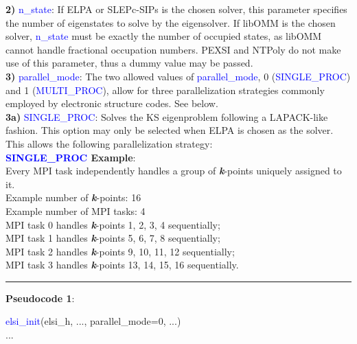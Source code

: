 \documentclass{report}
\begin{document}
\textbf{2)} \textcolor{blue}{n\_state}:  If ELPA or SLEPc-SIPs is the chosen solver, this parameter specifies the number of eigenstates to solve by the eigensolver.  If libOMM is the chosen solver, \textcolor{blue}{n\_state} must be exactly the number of occupied states, as libOMM cannot handle fractional occupation numbers\cite{libomm_corsetti_2014}.  PEXSI and NTPoly do not make use of this parameter, thus a dummy value may be passed.\\

\textbf{3)} \textcolor{blue}{parallel\_mode}:  The two allowed values of \textcolor{blue}{parallel\_mode}, 0 (\textcolor{blue}{SINGLE\_PROC}) and 1 (\textcolor{blue}{MULTI\_PROC}), allow for three parallelization strategies commonly employed by electronic structure codes.  See below.\\

\textbf{3a)} \textcolor{blue}{SINGLE\_PROC}:  Solves the KS eigenproblem following a LAPACK-like fashion.  This option may only be selected when ELPA is chosen as the solver.  This allows the following parallelization strategy:\\

\textbf{\textcolor{blue}{SINGLE\_PROC} Example}:\\

Every MPI task independently handles a group of \textbf{\textit{k}}-points uniquely assigned to it.\\

Example number of \textbf{\textit{k}}-points:  16\\
Example number of MPI tasks:  4\\

MPI task 0 handles \textbf{\textit{k}}-points  1,  2,  3,  4 sequentially;\\
MPI task 1 handles \textbf{\textit{k}}-points  5,  6,  7,  8 sequentially;\\
MPI task 2 handles \textbf{\textit{k}}-points  9, 10, 11, 12 sequentially;\\
MPI task 3 handles \textbf{\textit{k}}-points 13, 14, 15, 16 sequentially.\\

\noindent\rule{18cm}{0.4pt}

\textbf{Pseudocode 1}:\\

\begin{algorithm}[H]
\textcolor{blue}{elsi\_init}(elsi\_h, ..., parallel\_mode=0, ...)\\
...
\hspace{0.3cm}\\
\end{algorithm}
\end{document}
